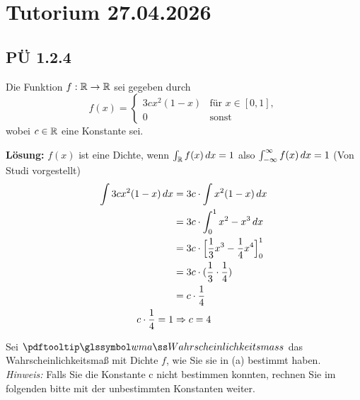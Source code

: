 

\section{Tutorium 27.04.2026}\label{ch:tutorium-27.04.2026}


\subsection{PÜ 1.2.4 \abhaken}\label{sec:pu-1.2.4}

Die Funktion $f: \mathbb{R} \rightarrow \mathbb{R}$ sei gegeben durch
\[
    f(x) = \begin{cases}
               3cx^2(1-x) & \text{für } x \in [0,1],
               \\ 0 & \text{sonst}
    \end{cases}
\]
wobei $c \in \mathbb{R}$ eine Konstante sei.
\begin{auf}
    \textbf{Lösung:} $f(x)$ ist eine Dichte, wenn $\int_{\mathbb{R}}  f(x) \,dx = 1$ also $\int_{-\infty}^{\infty}  f(x) \,dx = 1$ %
    (Von Studi vorgestellt)
    \begin{align*}
        \int 3cx^2(1-x) \,dx & = 3c \cdot \int x^2(1-x) \,dx \\
        & = 3c \cdot \int_0^1 x^2-x^3 \,dx \\
        & = 3c \cdot \Big[ \frac{1}{3} x^3 - \frac{1}{4} x^4 \Big]^1_0 \\
        & = 3c \cdot (\frac{1}{3} \cdot \frac{1}{4}) \\
        & = c \cdot \frac{1}{4} \\
        c\cdot \frac{1}{4} = 1 & \Rightarrow c = 4
    \end{align*}
\end{auf}
Sei $\pe$ das Wahrscheinlichkeitsmaß mit Dichte $f$, wie Sie sie in (a) bestimmt haben. \\
\textit{Hinweis:} Falls Sie die Konstante c nicht bestimmen konnten, rechnen Sie im folgenden bitte
mit der unbestimmten Konstanten weiter.

